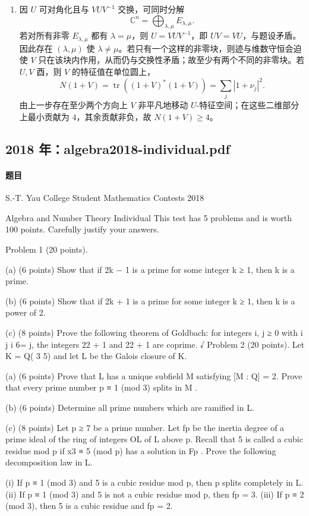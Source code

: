 \documentclass[UTF8,12pt]{ctexart}
\begin{document}
\begin{enumerate}[label=\textbf{\arabic*.},leftmargin=2.2em]
\item 因 \(U\) 可对角化且与 \(VUV^{-1}\) 交换，可同时分解
\[
\mathbb C^n=\bigoplus_{\lambda,\mu}E_{\lambda,\mu}.
\]
若对所有非零 \(E_{\lambda,\mu}\) 都有 \(\lambda=\mu\)，则 \(U=VUV^{-1}\)，即 \(UV=VU\)，与题设矛盾。因此存在 \((\lambda,\mu)\) 使 \(\lambda\ne\mu\)。若只有一个这样的非零块，则迹与维数守恒会迫使 \(V\) 只在该块内作用，从而仍与交换性矛盾；故至少有两个不同的非零块。若 \(U,V\) 酉，则 \(V\) 的特征值在单位圆上，
\[
N(1+V)=\operatorname{tr}((1+V)^*(1+V))=\sum_j |1+\nu_j|^2 .
\]
由上一步存在至少两个方向上 \(V\) 非平凡地移动 \(U\)-特征空间；在这些二维部分上最小贡献为 \(4\)，其余贡献非负，故 \(N(1+V)\ge4\)。
\end{enumerate}

\subsection{2018 年：algebra2018-individual.pdf}
\paragraph{题目}
S.-T. Yau College Student Mathematics Contests 2018

Algebra and Number Theory Individual This test has 5 problems and is worth 100 points. Carefully justify your answers.

Problem 1 (20 points).

(a) (6 points) Show that if 2k − 1 is a prime for some integer k ≥ 1, then k is a prime.

(b) (6 points) Show that if 2k + 1 is a prime for some integer k ≥ 1, then k is a power of 2.

(c) (8 points) Prove the following theorem of Goldbach: for integers i, j ≥ 0 with i j i 6= j, the integers 22 + 1 and 22 + 1 are coprime. √ Problem 2 (20 points). Let K = Q( 3 5) and let L be the Galois closure of K.

(a) (6 points) Prove that L has a unique subfield M satisfying [M : Q] = 2. Prove that every prime number p ≡ 1 (mod 3) splits in M .

(b) (6 points) Determine all prime numbers which are ramified in L.

(c) (8 points) Let p ≥ 7 be a prime number. Let fp be the inertia degree of a prime ideal of the ring of integers OL of L above p. Recall that 5 is called a cubic residue mod p if x3 ≡ 5 (mod p) has a solution in Fp . Prove the following decomposition law in L.

(i) If p ≡ 1 (mod 3) and 5 is a cubic residue mod p, then p splits completely in L. (ii) If p ≡ 1 (mod 3) and 5 is not a cubic residue mod p, then fp = 3. (iii) If p ≡ 2 (mod 3), then 5 is a cubic residue and fp = 2.
\end{document}
